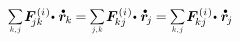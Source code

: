 \vspace{-0.3em}\noindent
{}
${
\raisebox{.1em}{\scalebox{.75}{$ \displaystyle \sum_{\smash{k,\hspace{.1ex}j}} $}}
\hspace{.2ex} \bm{F}^{\smthinternal}_{\hspace{-0.4ex}jk} \hspace{-0.3ex} \dotp \hspace{.1ex}
\mathdotabove{\locationvector}_{\hspace{-0.1ex}k}
\hspace{-0.1ex} = \hspace{-0.1ex}
\raisebox{.1em}{\scalebox{.75}{$ \displaystyle \sum_{\smash{j,\hspace{.1ex}k}} $}}
\hspace{.2ex} \bm{F}^{\smthinternal}_{\hspace{-0.16ex}kj} \hspace{-0.3ex} \dotp \hspace{.1ex}
\mathdotabove{\locationvector}_{\hspace{-0.2ex}j}
\hspace{-0.1ex} = \hspace{-0.1ex}
\raisebox{.1em}{\scalebox{.75}{$ \displaystyle \sum_{\smash{k,\hspace{.1ex}j}} $}}
\hspace{.2ex} \bm{F}^{\smthinternal}_{\hspace{-0.16ex}kj} \hspace{-0.3ex} \dotp \hspace{.1ex}
\mathdotabove{\locationvector}_{\hspace{-0.2ex}j}
}$

